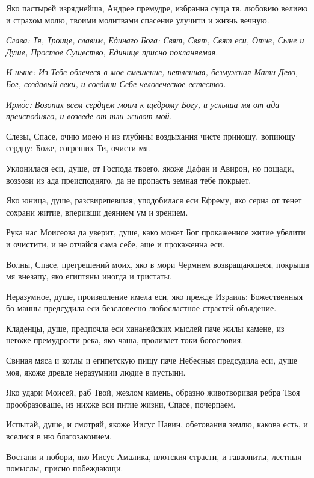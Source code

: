 Яко пастырей изряднейша, Андрее премудре, избранна суща тя, любовию велиею и страхом молю, твоими молитвами спасение улучити и жизнь вечную.

\itshape Слава\normalfont{}: Тя, Троице, славим, Единаго Бога: Свят, Свят, Свят еси, Отче, Сыне и Душе, Простое Существо, Единице присно покланяемая.

\itshape И ныне\normalfont{}: Из Тебе облечеся в мое смешение, нетленная, безмужная Мати Дево, Бог, создавый веки, и соедини Себе человеческое естество. 


\itshape Ирм\'{о}с\normalfont{}: Возопих всем сердцем моим к щедрому Богу, и услыша мя от ада преисподняго, и возведе от тли живот мой.

Слезы, Спасе, очию моею и из глубины воздыхания чисте приношу, вопиющу сердцу: Боже, согреших Ти, очисти мя.

Уклонилася еси, душе, от Господа твоего, якоже Дафан и Авирон, но пощади, воззови из ада преисподняго, да не пропасть земная тебе покрыет.

Яко юница, душе, разсвирепевшая, уподобилася еси Ефрему, яко серна от тенет сохрани житие, вперивши деянием ум и зрением.

Рука нас Моисеова да уверит, душе, како может Бог прокаженное житие убелити и очистити, и не отчайся сама себе, аще и прокаженна еси.

Волны, Спасе, прегрешений моих, яко в мори Чермнем возвращающеся, покрыша мя внезапу, яко египтяны иногда и тристаты.

Неразумное, душе, произволение имела еси, яко прежде Израиль: Божественныя бо манны предсудила еси безсловесно любосластное страстей объядение.

Кладенцы, душе, предпочла еси хананейских мыслей паче жилы камене, из негоже премудрости река, яко чаша, проливает токи богословия.

Свиная мяса и котлы и египетскую пищу паче Небесныя предсудила еси, душе моя, якоже древле неразумнии людие в пустыни.

Яко удари Моисей, раб Твой, жезлом камень, образно животворивая ребра Твоя прообразоваше, из нихже вси питие жизни, Спасе, почерпаем.

Испытай, душе, и смотряй, якоже Иисус Навин, обетования землю, какова есть, и вселися в ню благозаконием.

Востани и побори, яко Иисус Амалика, плотския страсти, и гаваониты, лестныя помыслы, присно побеждающи.


